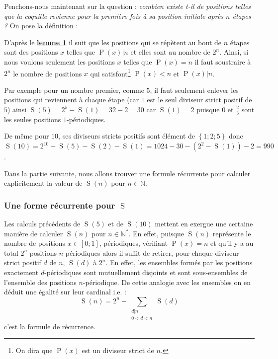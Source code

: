 \documentclass[a4paper,french,12pt]{article}
\begin{document}
Penchons-nous maintenant sur la question : \emph{combien existe t-il de positions telles que la coquille revienne pour la première fois à sa position initiale après $n$ étapes ?} On pose la définition :


D'après le \hyperlink{18}{\textbf{lemme 1}} il suit que les positions qui se répètent au bout de $n$ étapes sont des positions $x$ telles que $\operatorname{P}\left(x\right)|n$ et elles sont au nombre de $2^n$. Ainsi, si nous voulons seulement les positions $x$ telles que $\operatorname{P}\left(x\right)=n$ il faut soustraire à $2^n$ le nombre de positions $x$ qui satisfont\footnote{On dira que $\operatorname{P}\left(x\right)$ est un diviseur strict de $n$.} $\operatorname{P}\left(x\right)<n$ et $\operatorname{P}\left(x\right)|n$. 

Par exemple pour un nombre premier, comme $5$, il faut seulement enlever les positions qui reviennent à chaque étape (car $1$ est le seul diviseur strict positif de $5$) ainsi $\operatorname{S}\left(5\right)=2^5-\operatorname{S}\left(1\right)=32-2=30$ car $\operatorname{S}\left(1\right)=2$ puisque $0$ et $\frac{2}{3}$ sont les seules positions $1$-périodiques.

De même pour $10$, ses diviseurs stricts positifs sont élément de $\left\{1;2;5\right\}$ donc $\operatorname{S}\left(10\right)=2^{10}-\operatorname{S}\left(5\right)-\operatorname{S}\left(2\right)-\operatorname{S}\left(1\right)=1024-30-\left(2^2-\operatorname{S}\left(1\right)\right)-2=990$.

Dans la partie suivante, nous allons trouver une formule récurrente pour calculer explicitement la valeur de $\operatorname{S}\left(n\right)$ pour $n\in\mathbb{N}$.

\hypertarget{50}{}
\subsubsection{Une forme récurrente pour $\operatorname{S}$}
Les calculs précédents de $\operatorname{S}\left(5\right)$ et de $\operatorname{S}\left(10\right)$ mettent en exergue une certaine manière de calculer $\operatorname{S}\left(n\right)$ pour $n\in\mathbb{N}^*$. En effet, puisque $\operatorname{S}\left(n\right)$ représente le nombre de positions $x\in\left[0;1\right]$, périodiques, vérifiant $\operatorname{P}\left(x\right)=n$ et qu'il y a au total $2^n$ positions $n$-périodiques alors il suffit de retirer, pour chaque diviseur strict positif $d$ de $n$, $\operatorname{S}\left(d\right)$ à $2^n$. En effet, les ensembles formés par les positions exactement $d$-périodiques sont mutuellement disjoints et sont sous-ensembles de l'ensemble des positions $n$-périodique. De cette analogie avec les ensembles on en déduit une égalité sur leur cardinal i.e. : 
\[\operatorname{S}\left(n\right)=2^n-\sum_{\substack{d|n\\0<d<n}}\operatorname{S}\left(d\right)\]
c'est la formule de récurrence.
\end{document}

